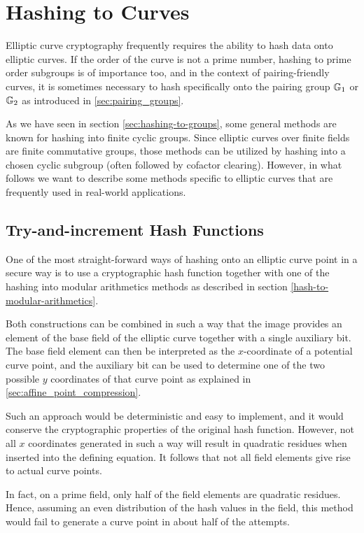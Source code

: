 
\section{Hashing to Curves} Elliptic curve cryptography frequently requires the ability to hash data onto elliptic curves. If the order of the curve is not a prime number, hashing to prime order subgroups is of importance too, and in the context of pairing-friendly curves, it is sometimes necessary to hash specifically onto the pairing group $\mathbb{G}_1$ or $\mathbb{G}_2$ as introduced in \ref{sec:pairing_groups}.

As we have seen in section \ref{sec:hashing-to-groups}, some general methods are known for hashing into finite cyclic groups. Since elliptic curves over finite fields are finite commutative groups, those methods can be utilized by hashing into a chosen cyclic subgroup (often followed by cofactor clearing). However, in what follows we want to describe some methods specific to elliptic curves that are frequently used in real-world applications. 

\subsection{Try-and-increment Hash Functions}
One of the most straight-forward ways of hashing onto an elliptic curve point in a secure way is to use a cryptographic hash function together with one of the hashing into modular arithmetics methods as described in section \ref{hash-to-modular-arithmetics}.

Both constructions can be combined in such a way that the image provides an element of the base field of the elliptic curve together with a single auxiliary bit. The base field element can then be interpreted as the $x$-coordinate of a potential curve point, and the auxiliary bit can be used to determine one of the two possible $y$ coordinates of that curve point as explained in \ref{sec:affine_point_compression}.

Such an approach would be deterministic and easy to implement, and it would conserve the cryptographic properties of the original hash function. However, not all $x$ coordinates generated in such a way will result in quadratic residues when inserted into the defining equation. It follows that not all field elements give rise to actual curve points. 

In fact,
on a prime field, only half of the field elements are quadratic residues. Hence, assuming an even distribution of the hash values in the field, this method would fail to generate a curve point in about half of the attempts. 

